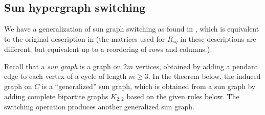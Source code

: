 \documentclass[12pt]{article}
\numberwithin{equation}{section}
\theoremstyle{definition}
\begin{document}
\subsection{Sun hypergraph switching}
We have a generalization of sun graph switching as found in \cite[Theorem 5, p.~6]{abiad_berg_simoens}, which is equivalent to the original description in \cite{mao_wang_liu_qiu_2023} (the matrices used for $R_{sg}$ in these descriptions are different, but equivalent up to a reordering of rows and columns.) 

Recall that a \textit{sun graph} is a graph on $2m$ vertices, obtained by adding a pendant edge to each vertex of a cycle of length $m\geq 3$. In the theorem below, the induced graph on $C$ is a ``generalized'' sun graph, which is obtained from a sun graph by adding complete bipartite graphs $K_{2,2}$ based on the given rules below. The switching operation produces another generalized sun graph. 
\end{document}
